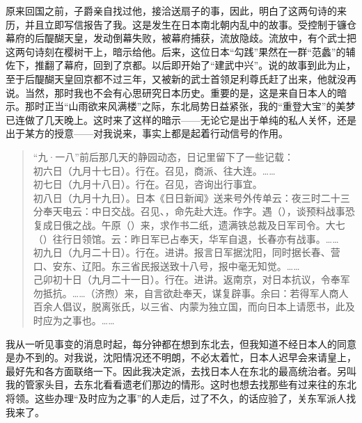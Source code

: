 原来回国之前，子爵亲自找过他，接洽送扇子的事，因此，明白了这两句诗的来历，并且立即写信报告了我。这是发生在日本南北朝内乱中的故事。受控制于镰仓幕府的后醍醐天皇，发动倒幕失败，被幕府捕获，流放隐歧。流放中，有个武士把这两句诗刻在樱树干上，暗示给他。后来，这位日本“勾践”果然在一群“范蠡”的辅佐下，推翻了幕府，回到了京都。以后即开始了“建武中兴”。说的故事到此为止，至于后醍醐天皇回京都不过三年，又被新的武士首领足利尊氏赶了出来，他就没再说。当然，那时我也不会有心思研究日本历史。重要的是，这是来自日本人的暗示。那时正当“山雨欲来风满楼”之际，东北局势日益紧张，我的“重登大宝”的美梦已连做了几天晚上。这时来了这样的暗示——无论它是出于单纯的私人关怀，还是出于某方的授意——对我说来，事实上都是起着行动信号的作用。\\

\begin{quote}
	“九·一八”前后那几天的静园动态，日记里留下了一些记载：\\

初六日（九月十七日）。行在。召见，商派、往大连。……\\

初七日（九月十八日）。行在。召见，咨询出行事宜。\\

初八日（九月十九日）。日本《日日新闻》送来号外传单云：夜三时二十三分奉天电云：中日交战。召见、，命先赴大连。作字。遇（），谈预料战事恐复成日俄之战。午原（）来，求作书二纸，遗满铁总裁及日军司令。大七（）往行日领馆。云：昨日军已占奉天，华军自退，长春亦有战事。……\\

初九日（九月二十日）。行在。进讲。报言日军据沈阳，同时据长春、营口、安东、辽阳。东三省民报送致十八号，报中毫无知觉。……\\

己卯初十日（九月二十一日）。行在。进讲。返南京，对日本抗议，令奉军勿抵抗。……（济煦）来，自言欲赴奉天，谋复辟事。余曰：若得军人商人百余人倡议，脱离张氏，以三省、内蒙为独立国，而向日本上请愿书，此及时应为之事也。……\\
\end{quote}

我从一听见事变的消息时起，每分钟都在想到东北去，但我知道不经日本人的同意是办不到的。对我说，沈阳情况还不明朗，不必太着忙，日本人迟早会来请皇上，最好先和各方面联络一下。因此我决定派，去找日本人在东北的最高统治者。另叫我的管家头目，去东北看看遗老们那边的情形。这时也想去找那些有过来往的东北将领。这些办理“及时应为之事”的人走后，过了不久，的话应验了，关东军派人找我来了。\\

